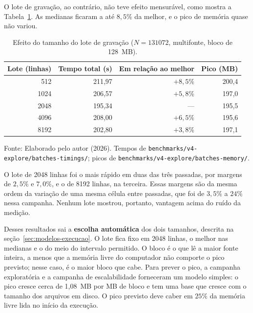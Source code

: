 O lote de gravação, ao contrário, não teve efeito mensurável, como mostra a
Tabela~\ref{tab:qp5-lote}. As medianas ficaram a até $8{,}5\%$ da melhor, e o pico de memória
quase não variou.

\begin{table}[H]
  \caption{Efeito do tamanho do lote de gravação ($N = \num{131072}$, multifonte, bloco de 128~MB).}
  \label{tab:qp5-lote}
  \centering
  \begin{tabular}{r r r r}
    \toprule
    \textbf{Lote (linhas)} & \textbf{Tempo total (s)} & \textbf{Em relação ao melhor} & \textbf{Pico (MB)} \\
    \midrule
       512 & 211{,}97 & $+8{,}5\%$ & 200{,}4 \\
    \num{1024} & 206{,}57 & $+5{,}8\%$ & 197{,}0 \\
    \num{2048} & 195{,}34 & ---        & 195{,}5 \\
    \num{4096} & 208{,}00 & $+6{,}5\%$ & 195{,}6 \\
    \num{8192} & 202{,}80 & $+3{,}8\%$ & 197{,}1 \\
    \bottomrule
  \end{tabular}
  \par\vspace{4pt}
  {\footnotesize Fonte: Elaborado pelo autor (2026). Tempos de \texttt{benchmarks/v4-explore/batches-timings/}; picos de \texttt{benchmarks/v4-explore/batches-memory/}.}
\end{table}

O lote de \num{2048} linhas foi o mais rápido em duas das três passadas, por margens de
$2{,}5\%$ e $7{,}0\%$, e o de \num{8192} linhas, na terceira. Essas margens são da mesma
ordem da variação de uma mesma célula entre passadas, que foi de $3{,}5\%$ a $24\%$ nessa
campanha. Nenhum lote mostrou, portanto, vantagem acima do ruído da medição.

Desses resultados sai a \textbf{escolha automática} dos dois tamanhos, descrita na
seção~\ref{sec:modelos-execucao}. O lote fica fixo em \num{2048} linhas, o melhor nas medianas
e o do meio do intervalo permitido. O bloco é o que lê a maior fonte inteira, a menos que a
memória livre do computador não comporte o pico previsto; nesse caso, é o maior bloco que
cabe. Para prever o pico, a campanha exploratória e a campanha de escalabilidade forneceram
um modelo simples: o pico cresce cerca de 1,08~MB por MB de bloco e tem uma base que cresce
com o tamanho dos arquivos em disco. O pico previsto deve caber em $25\%$ da memória livre
lida no início da execução.

